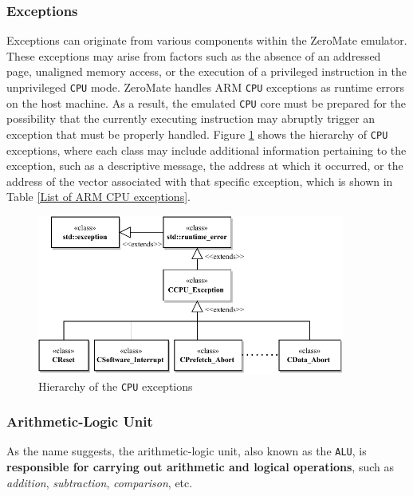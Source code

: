 \documentclass[english, ing, kiv, he, iso690numb, pdf]{fasthesis}
\begin{document}
	\subsubsection{Exceptions} \label{Exceptions}
	
	Exceptions can originate from various components within the ZeroMate emulator. These exceptions may arise from factors such as the absence of an addressed page, unaligned memory access, or the execution of a privileged instruction in the unprivileged \texttt{CPU} mode. ZeroMate handles ARM \texttt{CPU} exceptions as runtime errors on the host machine. As a result, the emulated \texttt{CPU} core must be prepared for the possibility that the currently executing instruction may abruptly trigger an exception that must be properly handled. Figure \ref{Hierarchy of the CPU exceptions} shows the hierarchy of \texttt{CPU} exceptions, where each class may include additional information pertaining to the exception, such as a descriptive message, the address at which it occurred, or the address of the vector associated with that specific exception, which is shown in Table \ref{List of ARM CPU exceptions}.
	
	\begin{figure}[ht]
		\centering
		\includegraphics[width=0.9\textwidth]{img/diagrams/exceptions.pdf}
		\caption{Hierarchy of the \texttt{CPU} exceptions}
		\label{Hierarchy of the CPU exceptions}
	\end{figure}
	
	\newpage
	
	\subsubsection{Arithmetic-Logic Unit}
	
	As the name suggests, the arithmetic-logic unit, also known as the \texttt{ALU}, is \textbf{responsible for carrying out arithmetic and logical operations}, such as \textit{addition}, \textit{subtraction}, \textit{comparison}, etc. 
	
\end{document}
